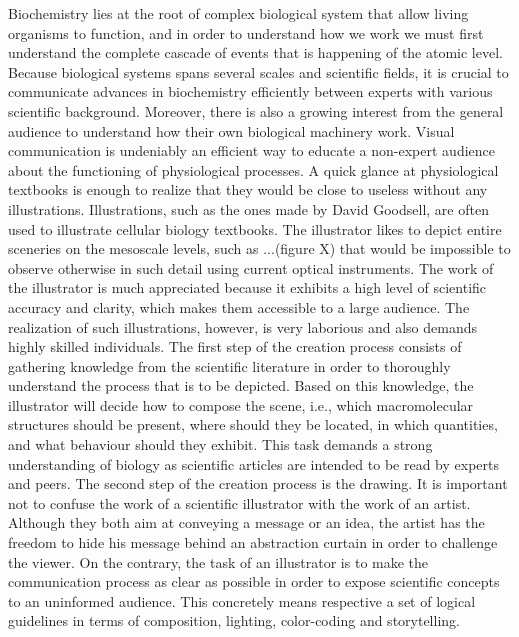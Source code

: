 Biochemistry lies at the root of complex biological system that allow living organisms to function, and in order to understand how we work we must first understand the complete cascade of events that is happening of the atomic level.
Because biological systems spans several scales and scientific fields, it is crucial to communicate advances in biochemistry efficiently between experts with various scientific background.
Moreover, there is also a growing interest from the general audience to understand how their own biological machinery work.
Visual communication is undeniably an efficient way to educate a non-expert audience about the functioning of physiological processes.
A quick glance at physiological textbooks is enough to realize that they would be close to useless without any illustrations.
Illustrations, such as the ones made by David Goodsell, are often used to illustrate cellular biology textbooks.
The illustrator likes to depict entire sceneries on the mesoscale levels, such as ...(figure X) that would be impossible to observe otherwise in such detail using current optical instruments.
The work of the illustrator is much appreciated because it exhibits a high level of scientific accuracy and clarity, which makes them accessible to a large audience. 
The realization of such illustrations, however, is very laborious and also demands highly skilled individuals.
The first step of the creation process consists of gathering knowledge from the scientific literature in order to thoroughly understand the process that is to be depicted.
Based on this knowledge, the illustrator will decide how to compose the scene, i.e., which macromolecular structures should be present, where should they be located, in which quantities, and what behaviour should they exhibit.
This task demands a strong understanding of biology as scientific articles are intended to be read by experts and peers.
The second step of the creation process is the drawing. 
It is important not to confuse the work of a scientific illustrator with the work of an artist.
Although they both aim at conveying a message or an idea, the artist has the freedom to hide his message behind an abstraction curtain in order to challenge the viewer.
On the contrary, the task of an illustrator is to make the communication process as clear as possible in order to expose scientific concepts to an uninformed audience.
This concretely means respective a set of logical guidelines in terms of composition, lighting, color-coding and storytelling.

